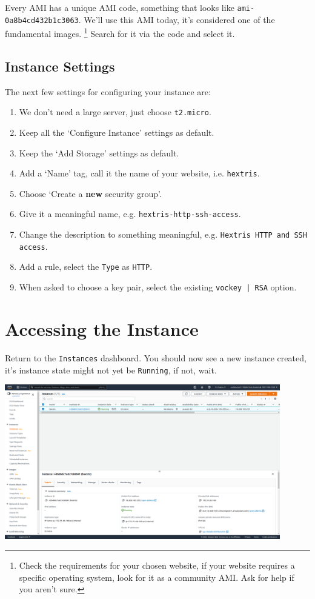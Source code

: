 \documentclass{csse4400}
\begin{document}
Every AMI has a unique AMI code, something that looks like \texttt{ami-0a8b4cd432b1c3063}.
We'll use this AMI today, it's considered one of the fundamental images.%
\footnote{Check the requirements for your chosen website, if your website requires a specific operating system, look for it as a community AMI.
Ask for help if you aren't sure.}
Search for it via the code and select it.

\subsection{Instance Settings}
The next few settings for configuring your instance are:
\begin{enumerate}
\item We don't need a large server, just choose \texttt{t2.micro}.
\item Keep all the `Configure Instance' settings as default.
\item Keep the `Add Storage' settings as default.
\item Add a `Name' tag, call it the name of your website, i.e. \texttt{hextris}.
\item Choose `Create a \textbf{new} security group'.
\item Give it a meaningful name, e.g. \texttt{hextris-http-ssh-access}.
\item Change the description to something meaningful, e.g. \texttt{Hextris HTTP and SSH access}.
\item Add a rule, select the \texttt{Type} as \texttt{HTTP}.
\item When asked to choose a key pair, select the existing \texttt{vockey | RSA} option.
\end{enumerate}

\section{Accessing the Instance}

Return to the \texttt{Instances} dashboard.
You should now see a new instance created, it's instance state might not yet be \texttt{Running}, if not, wait.

\includegraphics[width=0.9\textwidth]{images/instance-interface}
\end{document}
